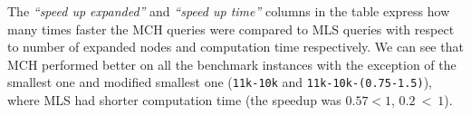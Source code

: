 
The {\em ``speed up expanded''} and {\em ``speed up time''} columns in the table express how many times faster the MCH queries were compared to MLS queries with respect to number of expanded nodes and computation time respectively. We can see that MCH performed better on all the benchmark instances with the exception of the smallest one and modified smallest one ({\tt 11k-10k} and {\tt 11k-10k-(0.75-1.5)}), where MLS had shorter computation time (the speedup was $0.57 < 1$, $0.2~<~1$).

%
%
%

